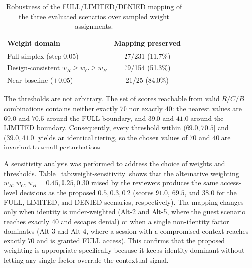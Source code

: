 \begin{table}[t]
  \caption{Robustness of the FULL/LIMITED/DENIED mapping of the three
  evaluated scenarios over sampled weight assignments.}
  \label{tab:robustness}
  \centering
  \begin{tabular}{lc}
    \hline
    \textbf{Weight domain} & \textbf{Mapping preserved} \\
    \hline
    Full simplex (step 0.05)          & 27/231 (11.7\%) \\
    Design-consistent $w_R\ge w_C\ge w_B$ & 79/154 (51.3\%) \\
    Near baseline ($\pm 0.05$)        & 21/25 (84.0\%) \\
    \hline
  \end{tabular}
\end{table}

The thresholds are not arbitrary. The set of scores reachable from valid
$R/C/B$ combinations contains neither exactly $70$ nor exactly $40$: the
nearest values are $69.0$ and $70.5$ around the FULL boundary, and $39.0$ and
$41.0$ around the LIMITED boundary. Consequently, every threshold within
$(69.0, 70.5]$ and $(39.0, 41.0]$ yields an identical tiering, so the chosen
values of $70$ and $40$ are invariant to small perturbations.


A sensitivity analysis was performed to address the choice of weights and
thresholds. Table~\ref{tab:weight-sensitivity} shows that the alternative
weighting $w_R,w_C,w_B = 0.45,0.25,0.30$ raised by the reviewers produces the
same access-level decisions as the proposed $0.5,0.3,0.2$ (scores $91.0$,
$69.5$, and $38.0$ for the FULL, LIMITED, and DENIED scenarios, respectively).
The mapping changes only when identity is under-weighted (Alt-2 and Alt-5,
where the guest scenario reaches exactly $40$ and escapes denial) or when a
single non-identity factor dominates (Alt-3 and Alt-4, where a session with a
compromised context reaches exactly $70$ and is granted FULL access). This
confirms that the proposed weighting is appropriate specifically because it
keeps identity dominant without letting any single factor override the
contextual signal.

